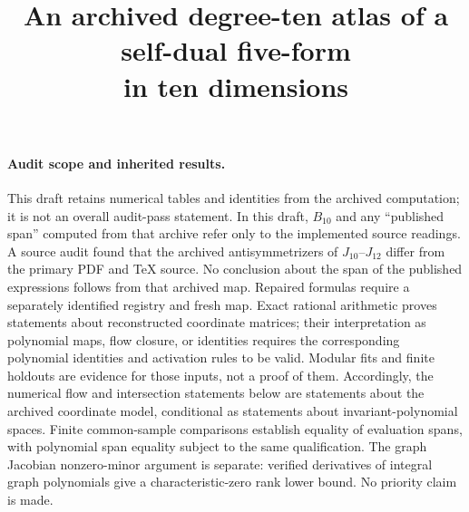 \documentclass[11pt,a4paper]{article}
\title{An archived degree-ten atlas of a self-dual five-form\\ in ten dimensions}
\author{\pending{Author list pending mentor review}}
\theoremstyle{definition}
\theoremstyle{remark}
\begin{document}
\maketitle

\paragraph{Audit scope and inherited results.}
This draft retains numerical tables and identities from the archived computation;
it is not an overall audit-pass statement. In this draft, $B_{10}$ and any
``published span'' computed from that archive refer only to the implemented
source readings. A source audit found that the archived antisymmetrizers of
$J_{10}$--$J_{12}$ differ from the primary PDF and TeX source. No conclusion
about the span of the published expressions follows from that archived map.
Repaired formulas require a separately identified registry and fresh map.
Exact rational arithmetic proves statements about reconstructed coordinate
matrices; their interpretation as polynomial maps, flow closure, or identities
requires the corresponding polynomial identities and activation rules to be
valid. Modular fits and finite holdouts are evidence for those inputs, not a
proof of them. Accordingly, the numerical flow and intersection statements
below are statements about the archived coordinate model, conditional as
statements about invariant-polynomial spaces. Finite common-sample comparisons
establish equality of evaluation spans, with polynomial span equality subject
to the same qualification. The graph Jacobian nonzero-minor argument is
separate: verified derivatives of integral graph polynomials give a
characteristic-zero rank lower bound. No priority claim is made.


\begin{center}
\end{center}
\vspace{6pt}
\end{document}

